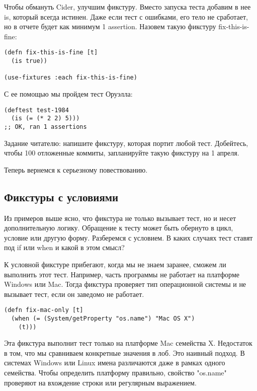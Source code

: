 Чтобы обмануть Cider, улучшим фикстуру. Вместо запуска теста добавим в нее is,
который всегда истинен. Даже если тест с ошибками, его тело не сработает, но в
отчете будет как минимум 1 assertion. Назовем такую фикстуру fix-this-is-fine:

\begin{verbatim}
(defn fix-this-is-fine [t]
  (is true))

(use-fixtures :each fix-this-is-fine)
\end{verbatim}

С ее помощью мы пройдем тест Оруэлла:

\begin{verbatim}
(deftest test-1984
  (is (= (* 2 2) 5)))
;; OK, ran 1 assertions
\end{verbatim}

Задание читателю: напишите фикстуру, которая портит любой тест. Добейтесь, чтобы
100%
отложенные коммиты, запланируйте такую фикстуру на 1 апреля.

Теперь вернемся к серьезному повествованию.

\subsection{Фикстуры с условиями}

Из примеров выше ясно, что фикстура не только вызывает тест, но и несет
дополнительную логику. Обращение к тесту может быть обернуто в цикл, условие или
другую форму. Разберемся с условием. В каких случаях тест ставят под if или when
и какой в этом смысл?

К условной фикстуре прибегают, когда мы не знаем заранее, сможем ли выполнить
этот тест. Например, часть программы не работает на платформе Windows или
Mac. Тогда фикстура проверяет тип операционной системы и не вызывает тест, если
он заведомо не работает.

\begin{verbatim}
(defn fix-mac-only [t]
  (when (= (System/getProperty "os.name") "Mac OS X")
    (t)))
\end{verbatim}

Эта фикстура выполнит тест только на платформе Mac семейства X. Недостаток в
том, что мы сравниваем конкретные значения в лоб. Это наивный подход. В системах
Windows или Linux имена различаются даже в рамках одного семейства. Чтобы
определить платформу правильно, свойство "os.name" проверяют на вхождение строки
или регулярным выражением.

